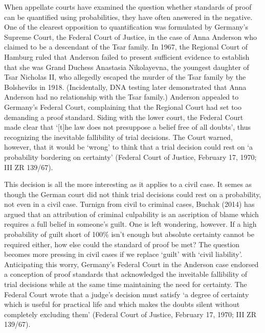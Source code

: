 \documentclass[10pt,dvipsnames,enabledeprecatedfontcommands]{scrartcl}
\begin{document}
When appellate courts have examined the question whether standards of
proof can be quantified using probabilities, they have often answered in
the negative. One of the clearest opposition to quantification was
formulated by Germany's Supreme Court, the Federal Court of Justice, in
the case of Anna Anderson who claimed to be a descendant of the Tsar
family. In 1967, the Regional Court of Hamburg ruled that Anderson
failed to present sufficient evidence to establish that she was Grand
Duchess Anastasia Nikolayevna, the youngest daughter of Tsar Nicholas
II, who allegedly escaped the murder of the Tsar family by the
Bolsheviks in 1918. (Incidentally, DNA testing later demonstrated that
Anna Anderson had no relationship with the Tsar family.) Anderson
appealed to Germany's Federal Court, complaining that the Regional Court
had set too demanding a proof standard. Siding with the lower court, the
Federal Court made clear that `{[}t{]}he law does not presuppose a
belief free of all doubts', thus recognizing the inevitable fallibility
of trial decisions. The Court warned, however, that it would be `wrong'
to think that a trial decision could rest on `a probability bordering on
certainty' (Federal Court of Justice, February 17, 1970; III ZR 139/67).

This decision is all the more interesting as it applies to a civil case.
It semes as though the German court did not think trial decisions could
rest on a probability, not even in a civil case. Turnign from civil to
criminal cases, Buchak (2014) has argued that an attribution of criminal
culpability is an ascription of blame which requires a full belief in
someone's guilt. One is left wondering, however. If a high probability
of guilt short of 100\% isn't enough but absolute certainty cannot be
required either, how else could the standard of proof be met? The
question becomes more pressing in civil cases if we replace `guilt' with
`civil liability'. Anticipating this worry, Germany's Federal Court in
the Anderson case endorsed a conception of proof standards that
acknowledged the inveitable fallibility of trial decisions while at the
same time maintaining the need for certainty. The Federal Court wrote
that a judge's decision must satisfy `a degree of certainty which is
useful for practical life and which makes the doubts silent without
completely excluding them' (Federal Court of Justice, February 17, 1970;
III ZR 139/67).
\end{document}
